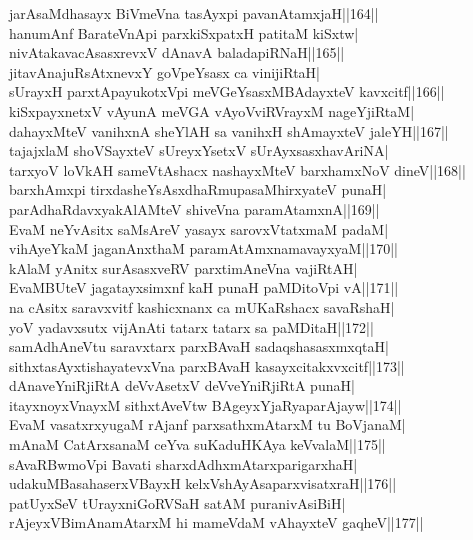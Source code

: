\documentclass{article}
\begin{document}
jarAsaMdhasayx BiVmeVna tasAyxpi pavanAtamxjaH||164||\\
hanumAnf BarateVnApi parxkiSxpatxH patitaM kiSxtw|\\
nivAtakavacAsasxrevxV dAnavA baladapiRNaH||165||\\
jitavAnajuRsAtxnevxY goVpeYsasx ca vinijiRtaH|\\
sUrayxH parxtApayukotxVpi meVGeYsasxMBAdayxteV kavxcitf||166||\\
kiSxpayxnetxV vAyunA meVGA vAyoVviRVrayxM nageYjiRtaM|\\
dahayxMteV vanihxnA sheYlAH sa vanihxH shAmayxteV jaleYH||167||\\
tajajxlaM shoVSayxteV sUreyxYsetxV sUrAyxsasxhavAriNA|\\
tarxyoV loVkAH sameVtAshacx nashayxMteV barxhamxNoV dineV||168||\\
barxhAmxpi tirxdasheYsAsxdhaRmupasaMhirxyateV punaH|\\
parAdhaRdavxyakAlAMteV shiveVna paramAtamxnA||169||\\
EvaM neYvAsitx saMsAreV yasayx sarovxVtatxmaM padaM|\\
vihAyeYkaM jaganAnxthaM paramAtAmxnamavayxyaM||170||\\
kAlaM yAnitx surAsasxveRV parxtimAneVna vajiRtAH|\\
EvaMBUteV jagatayxsimxnf kaH punaH paMDitoVpi vA||171||\\
na cAsitx saravxvitf kashicxnanx ca mUKaRshacx savaRshaH|\\
yoV yadavxsutx vijAnAti tatarx tatarx sa paMDitaH||172||\\
samAdhAneVtu saravxtarx parxBAvaH sadaqshasasxmxqtaH|\\
sithxtasAyxtishayatevxVna parxBAvaH kasayxcitakxvxcitf||173||\\
dAnaveYniRjiRtA deVvAsetxV deVveYniRjiRtA punaH|\\
itayxnoyxVnayxM sithxtAveVtw BAgeyxYjaRyaparAjayw||174||\\
EvaM vasatxrxyugaM rAjanf parxsathxmAtarxM tu BoVjanaM|\\
mAnaM CatArxsanaM ceYva suKaduHKAya keVvalaM||175||\\
sAvaRBwmoVpi Bavati sharxdAdhxmAtarxparigarxhaH|\\
udakuMBasahaserxVBayxH kelxVshAyAsaparxvisatxraH||176||\\
patUyxSeV tUrayxniGoRVSaH satAM puranivAsiBiH|\\
rAjeyxVBimAnamAtarxM hi mameVdaM vAhayxteV gaqheV||177||\\
\end{document}
